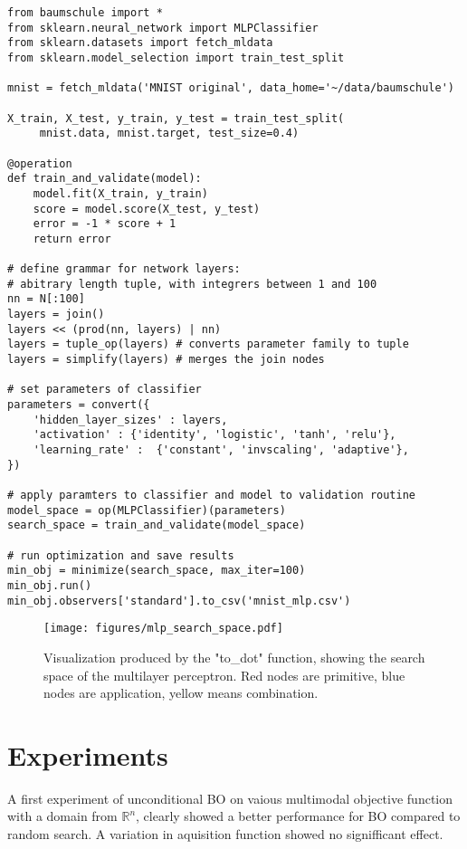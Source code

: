 \documentclass[english]{article}
\begin{document}
\begin{verbatim}
from baumschule import *
from sklearn.neural_network import MLPClassifier
from sklearn.datasets import fetch_mldata
from sklearn.model_selection import train_test_split

mnist = fetch_mldata('MNIST original', data_home='~/data/baumschule')

X_train, X_test, y_train, y_test = train_test_split(
     mnist.data, mnist.target, test_size=0.4)

@operation
def train_and_validate(model):
    model.fit(X_train, y_train)
    score = model.score(X_test, y_test)
    error = -1 * score + 1
    return error

# define grammar for network layers:
# abitrary length tuple, with integrers between 1 and 100
nn = N[:100]
layers = join()
layers << (prod(nn, layers) | nn)
layers = tuple_op(layers) # converts parameter family to tuple
layers = simplify(layers) # merges the join nodes

# set parameters of classifier
parameters = convert({
    'hidden_layer_sizes' : layers,
    'activation' : {'identity', 'logistic', 'tanh', 'relu'},
    'learning_rate' :  {'constant', 'invscaling', 'adaptive'},
})

# apply paramters to classifier and model to validation routine
model_space = op(MLPClassifier)(parameters)
search_space = train_and_validate(model_space)

# run optimization and save results
min_obj = minimize(search_space, max_iter=100)
min_obj.run()
min_obj.observers['standard'].to_csv('mnist_mlp.csv')

\end{verbatim}

\begin{figure}
  \texttt{[image: figures/mlp\_search\_space.pdf]}
  \caption{Visualization produced by the "to\_dot" function, showing the search space of the multilayer perceptron. Red nodes are primitive, blue nodes are application, yellow means combination.}
  \label{mlp_search_space}
\end{figure}


\section{Experiments}
A first experiment of unconditional BO on vaious multimodal objective function with a domain from $\mathbb{R}^n$, clearly showed a better performance for BO compared to random search. A variation in aquisition function showed no signifficant effect.
\end{document}
